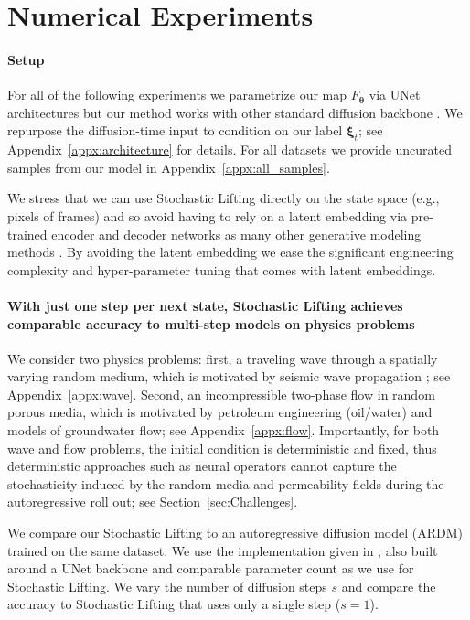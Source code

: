 \documentclass{article}
\theoremstyle{plain}
\theoremstyle{definition}
\theoremstyle{remark}
\newcommand{\bfxi}{{\bm \xi}}
\newcommand{\bftheta}{\bm{\theta}}
\newcommand{\map}{F_{\bftheta}}
\begin{document}
\section{Numerical Experiments}
\label{sec:NumericalExperiments}
\vspace*{-0.15cm}\paragraph{Setup}
For all of the following experiments we parametrize our map $\map$ via UNet architectures \cite{RonnebergerUnet} but our method works with other standard diffusion backbone \cite{peebles2023scalable,bao2023all,hoogeboom2023simple}. We repurpose the diffusion-time input to condition on our label $\bfxi_t$; see Appendix~\ref{appx:architecture} for details. For all datasets we provide uncurated samples from our model in Appendix~\ref{appx:all_samples}.

We stress that we can use Stochastic Lifting directly on the state space (e.g., pixels of frames) and so avoid having to rely on a latent embedding via pre-trained encoder and decoder networks as many other generative modeling methods \cite{Rombach2022}. By avoiding the latent embedding we ease the significant engineering complexity and hyper-parameter tuning that comes with latent embeddings.

\vspace*{-0.15cm}\paragraph{With just one step per next state, Stochastic Lifting achieves comparable accuracy to multi-step models on physics problems}
We consider two physics problems: first, a traveling wave through a spatially varying random medium, which is motivated by seismic wave propagation \cite{sato2012seismic}; see Appendix~\ref{appx:wave}. Second, an incompressible two-phase flow in random porous media, which is motivated by petroleum engineering (oil/water) and models of groundwater flow; see Appendix~\ref{appx:flow}. Importantly, for both wave and flow problems, the initial condition is deterministic and fixed, thus deterministic approaches such as neural operators cannot capture the stochasticity induced by the random media and permeability fields during the autoregressive roll out; see Section~\ref{sec:Challenges}.

We compare our Stochastic Lifting to an autoregressive diffusion model (ARDM) trained on the same dataset. We use the implementation given in \cite{KOHL2026108641}, also built around a UNet backbone and comparable parameter count as we use for Stochastic Lifting. We vary the number of diffusion steps $s$ and compare the accuracy to Stochastic Lifting  that uses only a single step ($s = 1$).
\end{document}
